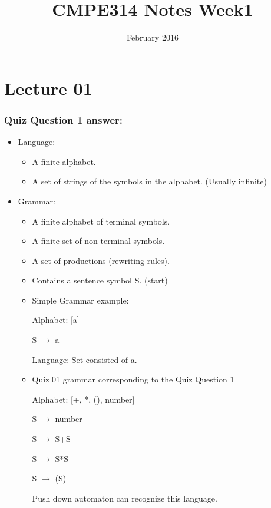 \documentclass{article}
\title{CMPE314 Notes Week1}
\date{February 2016}
\begin{document}
\maketitle

\section{Lecture 01}
\subsubsection*{Quiz Question 1 answer:}
    
\begin{itemize}

\item  Language: 
    \begin{itemize}
        \item A finite alphabet.
        \item A set of strings of the symbols in the alphabet. (Usually infinite)

    \end{itemize}

\item Grammar:
    \begin{itemize}
        \item A finite alphabet of terminal symbols.
        \item A finite set of non-terminal symbols.
        \item  A set of productions (rewriting rules).
        \item Contains a sentence symbol S. (start)
        \item Simple Grammar example: 
    
        Alphabet: [a]
    
        S  $\rightarrow$  a
    
        Language: Set consisted of a.
        
        \item Quiz 01 grammar corresponding to the Quiz Question 1
        
        Alphabet: [+, *, (), number]
        
        S  $\rightarrow$ number
        
        S  $\rightarrow$ S+S 
        
        S  $\rightarrow$ S*S
        
        S $\rightarrow$ (S)
        
        Push down automaton can recognize this language.
        
        
        \end{itemize}
        
\end{itemize}
\end{document}

